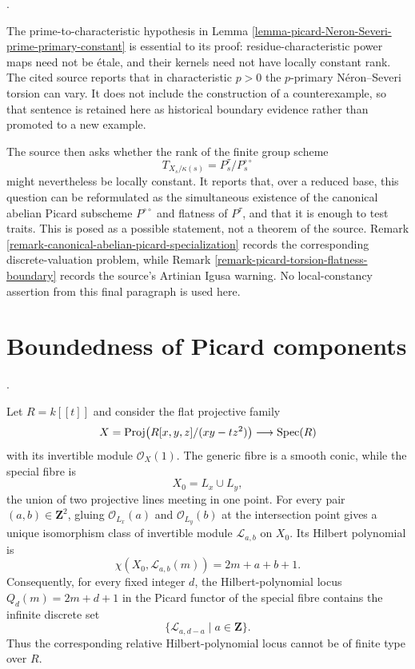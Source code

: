 \begin{remark}
\label{remark-picard-primary-Neron-Severi-boundary}
\begin{reference}
\cite[Expos\'e 236, Remark 3.10, p. 241]{FGA}.
\end{reference}
The prime-to-characteristic hypothesis in Lemma
\ref{lemma-picard-Neron-Severi-prime-primary-constant} is essential to its
proof: residue-characteristic power maps need not be \'etale, and their
kernels need not have locally constant rank. The cited source reports that
in characteristic $p>0$ the $p$-primary N\'eron--Severi torsion can vary. It
does not include the construction of a counterexample, so that sentence is
retained here as historical boundary evidence rather than promoted to a new
example.

The source then asks whether the rank of the finite group scheme
$$
T_{X_s/\kappa(s)}=
P^\tau_s/P^{\circ\circ}_s
$$
might nevertheless be locally constant. It reports that, over a reduced
base, this question can be reformulated as the simultaneous existence of the
canonical abelian Picard subscheme $P^{\circ\circ}$ and flatness of
$P^\tau$, and that it is enough to test traits. This is posed as a possible
statement, not a theorem of the source. Remark
\ref{remark-canonical-abelian-picard-specialization} records the corresponding
discrete-valuation problem, while Remark
\ref{remark-picard-torsion-flatness-boundary} records the source's Artinian
Igusa warning. No local-constancy assertion from this final paragraph is used
here.
\end{remark}

\section{Boundedness of Picard components}
\label{section-picard-boundedness}

\begin{example}
\label{example-picard-conic-fixed-Hilbert-not-finite-type}
\begin{reference}
\cite[Expos\'e 236, Section 4, pp. 241--242]{FGA}.
\end{reference}
Let $R=k[[t]]$ and consider the flat projective family
$$
X=\mathop{\rm Proj}\bigl(R[x,y,z]/(xy-tz^2)\bigr)
\longrightarrow\mathop{\mathrm{Spec}}(R)
$$
with its invertible module $\mathcal{O}_X(1)$. The generic fibre is a smooth
conic, while the special fibre is
$$
X_0=L_x\cup L_y,
$$
the union of two projective lines meeting in one point. For every pair
$(a,b)\in\mathbf Z^2$, gluing
$\mathcal{O}_{L_x}(a)$ and $\mathcal{O}_{L_y}(b)$ at the intersection point
gives a unique isomorphism class of invertible module $\mathcal{L}_{a,b}$ on
$X_0$. Its Hilbert polynomial is
$$
\chi(X_0,\mathcal{L}_{a,b}(m))=2m+a+b+1.
$$
Consequently, for every fixed integer $d$, the Hilbert-polynomial locus
$Q_d(m)=2m+d+1$ in the Picard functor of the special fibre contains the
infinite discrete set
$$
\{\mathcal{L}_{a,d-a}\mid a\in\mathbf Z\}.
$$
Thus the corresponding relative Hilbert-polynomial locus cannot be of finite
type over $R$.
\end{example}

